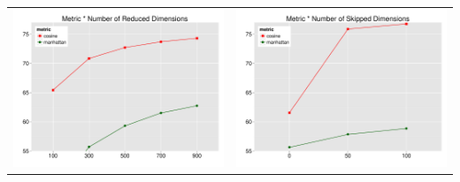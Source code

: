 \documentclass[t]{beamer} %
\begin{document}
\begin{frame}
{\begin{tabular}{c@{}c}
      \includegraphics[scale=0.30]{img/lapesa_toefl_main_metric_n-dim} &
      \includegraphics[scale=0.30]{img/lapesa_toefl_main_metric_dim-skip}
    \end{tabular}
  }
\end{frame}
\end{document}
